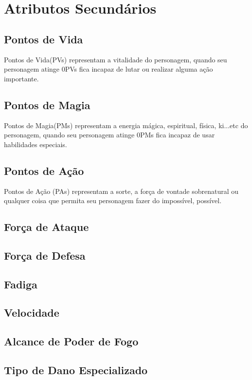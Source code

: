 \section{Atributos Secundários}

\subsection{Pontos de Vida}

Pontos de Vida(PVs) representam a vitalidade do personagem, quando seu personagem atinge 0PVs fica incapaz de lutar ou realizar alguma ação importante.

\subsection{Pontos de Magia}

Pontos de Magia(PMs) representam a energia mágica, espiritual, física, ki...etc do personagem, quando seu personagem atinge 0PMs fica incapaz de usar habilidades especiais.

\subsection{Pontos de Ação}

Pontos de Ação (PAs) representam a sorte, a força de vontade sobrenatural ou qualquer coisa que permita seu personagem fazer do impossível, possível.

\subsection{Força de Ataque}

\subsection{Força de Defesa}

\subsection{Fadiga}

\subsection{Velocidade}

\subsection{Alcance de Poder de Fogo}

\subsection{Tipo de Dano Especializado}
